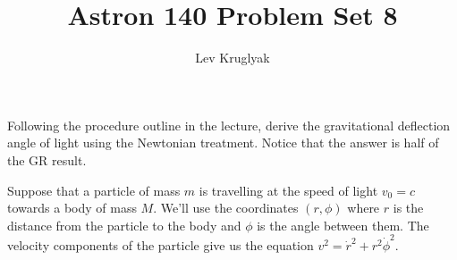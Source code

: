 \documentclass{../../templates/lkx_pset}
\title{Astron 140 Problem Set 8}
\author{Lev Kruglyak}
\begin{document}
\maketitle

\begin{problem}{1}
  Following the procedure outline in the lecture, derive the gravitational deflection angle of light using the Newtonian treatment. Notice that the answer is half of the GR result.
\end{problem}

\begin{solution}

  Suppose that a particle of mass $m$ is travelling at the speed of light $v_0 = c$ towards a body of mass $M$. We'll use the coordinates $(r,\phi)$ where $r$ is the distance from the particle to the body and $\phi$ is the angle between them. The velocity components of the particle give us the equation $v^2 = \dot{r}^2 + r^2\dot{\phi}^2$.


\end{solution}
\end{document}
